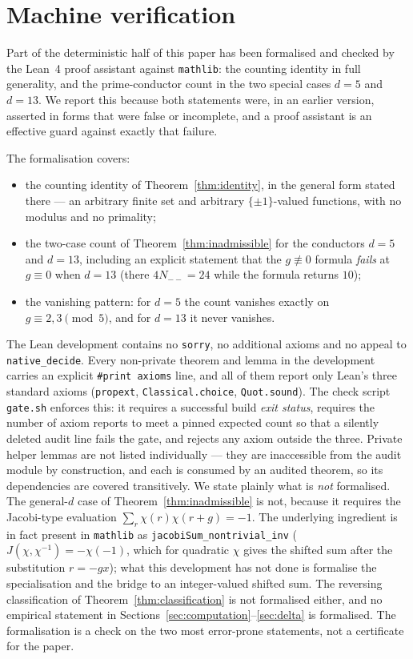 \documentclass[11pt,reqno]{amsart}
\theoremstyle{plain}
\theoremstyle{definition}
\begin{document}
\section{Machine verification}
\label{sec:formal}

Part of the deterministic half of this paper has been formalised and checked
by the Lean~4 proof assistant against \texttt{mathlib}: the counting identity
in full generality, and the prime-conductor count in the two special cases
$d = 5$ and $d = 13$. We report this because both statements were, in an earlier
version, asserted in forms that were false or incomplete, and a proof
assistant is an effective guard against exactly that failure.

The formalisation covers:
\begin{itemize}
\item the counting identity of Theorem~\ref{thm:identity}, in the general form
      stated there --- an arbitrary finite set and arbitrary $\{\pm 1\}$-valued
      functions, with no modulus and no primality;
\item the two-case count of Theorem~\ref{thm:inadmissible} for the conductors
      $d = 5$ and $d = 13$, including an explicit statement that the
      $g \not\equiv 0$ formula \emph{fails} at $g \equiv 0$ when $d = 13$
      (there $4N_{--} = 24$ while the formula returns $10$);
\item the vanishing pattern: for $d = 5$ the count vanishes exactly on
      $g \equiv 2, 3 \pmod 5$, and for $d = 13$ it never vanishes.
\end{itemize}

\sloppypar
The Lean development contains no \texttt{sorry}, no additional axioms and no
appeal to \texttt{native\_decide}. Every non-private theorem and lemma in the
development carries an explicit \texttt{\#print axioms} line, and all of them
report only Lean's three standard axioms (\texttt{propext},
\texttt{Classical.choice}, \texttt{Quot.sound}). The check script
\texttt{gate.sh} enforces this: it requires a successful build \emph{exit
status}, requires the number of axiom reports to meet a pinned expected count
so that a silently deleted audit line fails the gate, and rejects any axiom
outside the three. Private helper lemmas are not listed individually --- they
are inaccessible from the audit module by construction, and each is consumed
by an audited theorem, so its dependencies are covered transitively. We state plainly what
is \emph{not} formalised. The general-$d$ case of
Theorem~\ref{thm:inadmissible} is not, because it requires the Jacobi-type
evaluation $\sum_r \chi(r)\chi(r+g) = -1$. The underlying ingredient is in
fact present in \texttt{mathlib} as \texttt{jacobiSum\_nontrivial\_inv}
($J(\chi, \chi^{-1}) = -\chi(-1)$, which for quadratic $\chi$ gives the shifted
sum after the substitution $r = -gx$); what this development has not done is
formalise the specialisation and the bridge to an integer-valued shifted sum. The reversing classification of
Theorem~\ref{thm:classification} is not formalised either, and no empirical
statement in
Sections~\ref{sec:computation}--\ref{sec:delta} is formalised. The
formalisation is a check on the two most error-prone statements, not a
certificate for the paper.
\end{document}
